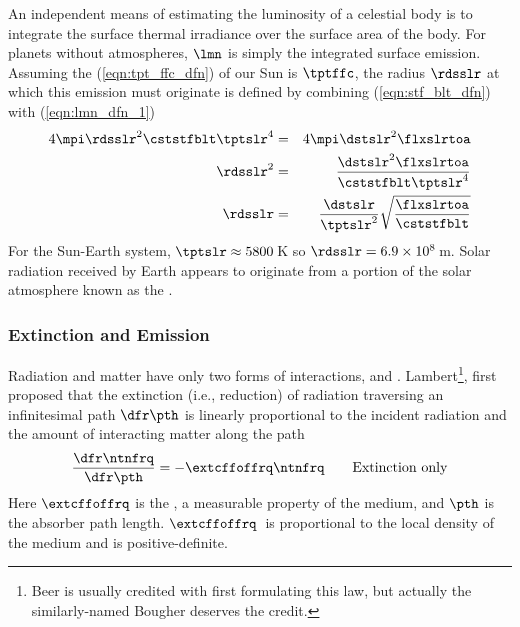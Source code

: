 \documentclass[12pt]{article}
\begin{document}
An independent means of estimating the luminosity of a celestial body 
is to integrate the surface thermal irradiance over the surface area
of the body.
For planets without atmospheres, $\lmn$ is simply the integrated
surface emission. 
Assuming the  (\ref{eqn:tpt_ffc_dfn}) of
our Sun is $\tptffc$, the radius $\rdsslr$ at which this emission must
originate is defined by combining (\ref{eqn:stf_blt_dfn}) with
(\ref{eqn:lmn_dfn_1})
\begin{eqnarray}
4\mpi\rdsslr^{2} \cststfblt \tptslr^{4} & = & 4\mpi\dstslr^{2} \flxslrtoa 
\nonumber \\
\rdsslr^{2} & = & \frac{\dstslr^{2} \flxslrtoa}{\cststfblt \tptslr^{4}} 
\nonumber \\
\rdsslr & = &
\frac{\dstslr}{\tptslr^{2}}\sqrt{\frac{\flxslrtoa}{\cststfblt}} 
\label{eqn:rds_slr_dfn}
\end{eqnarray}
For the Sun-Earth system, $\tptslr \approx 5800$\,K so
$\rdsslr = 6.9 \times 10^{8}$\,m. 
Solar radiation received by Earth appears to originate from a portion
of the solar atmosphere known as the . 

\subsubsection[Extinction and Emission]{Extinction and Emission}\label{sxn:ext}
Radiation and matter have only two forms of interactions,
 and .
Lambert\footnote{Beer is usually credited with first formulating this
law, but actually the similarly-named Bougher deserves the credit.},
first proposed that the extinction (i.e., reduction) of radiation 
traversing an infinitesimal path $\dfr\pth$ is linearly proportional
to the incident radiation and the amount of interacting matter along
the path
\begin{equation}
\frac{\dfr\ntnfrq}{\dfr\pth} = -\extcffoffrq \ntnfrq \qquad\mathrm{Extinction\ only}
\label{eqn:ext_dfn}
\end{equation}
Here $\extcffoffrq$ is the , a
measurable property of the medium, and $\pth$ is the absorber path 
length. 
$\extcffoffrq$~is proportional to the local density of the medium and
is positive-definite.
\end{document}
